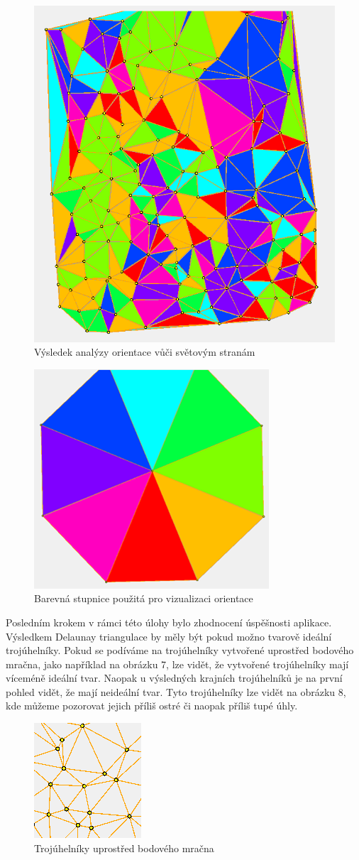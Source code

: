 \documentclass{article}
\begin{document}
\begin{spacing}{1.5}
\begin{figure}[htbp]
    \centering
    \includegraphics[width=0.4\linewidth]{images/05orientace.png}
    \caption{Výsledek analýzy orientace vůči světovým stranám}
    \label{fig:enter-label}
\end{figure}

\begin{figure}[htbp]
    \centering
    \includegraphics[width=0.3\linewidth]{images/06barvy.png}
    \caption{Barevná stupnice použitá pro vizualizaci orientace}
    \label{fig:enter-label}
\end{figure}

\newpage
Posledním krokem v rámci této úlohy bylo zhodnocení úspěšnosti aplikace. Výsledkem Delaunay triangulace by měly být pokud možno tvarově ideální trojúhelníky. Pokud se podíváme na trojúhelníky vytvořené uprostřed bodového mračna, jako například na obrázku 7, lze vidět, že vytvořené trojúhelníky mají víceméně ideální tvar. Naopak u výsledných krajních trojúhelníků je na první pohled vidět, že mají neideální tvar. Tyto trojúhelníky lze vidět na obrázku 8, kde můžeme pozorovat jejich příliš ostré či naopak příliš tupé úhly.

\begin{figure}[htbp]
    \centering
    \includegraphics[width=0.2\linewidth]{images/07trojuhelnik.png}
    \caption{Trojúhelníky uprostřed bodového mračna}
    \label{fig:enter-label}
\end{figure}


\end{spacing}
\end{document}
